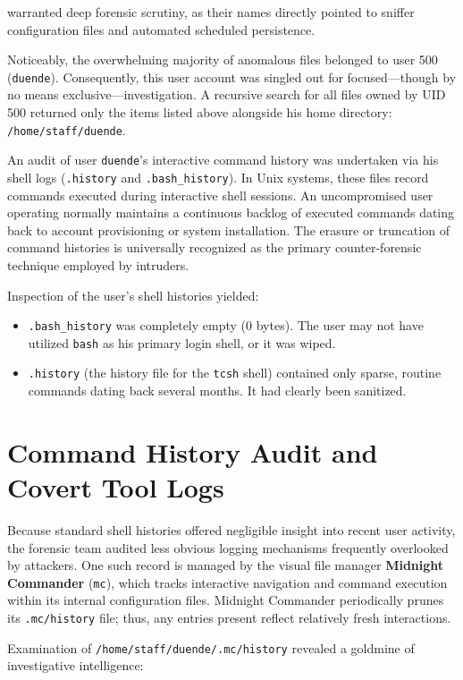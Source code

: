 warranted deep forensic scrutiny, as their names directly pointed to sniffer configuration files and automated scheduled persistence.

Noticeably, the overwhelming majority of anomalous files belonged to user 500 (\texttt{duende}). Consequently, this user account was singled out for focused---though by no means exclusive---investigation. A recursive search for all files owned by UID 500 returned only the items listed above alongside his home directory: \texttt{/home/staff/duende}.

An audit of user \texttt{duende}'s interactive command history was undertaken via his shell logs (\texttt{.history} and \texttt{.bash\_history}). In Unix systems, these files record commands executed during interactive shell sessions. An uncompromised user operating normally maintains a continuous backlog of executed commands dating back to account provisioning or system installation. The erasure or truncation of command histories is universally recognized as the primary counter-forensic technique employed by intruders.

Inspection of the user's shell histories yielded:
\begin{itemize}
    \item \texttt{.bash\_history} was completely empty (0 bytes). The user may not have utilized \texttt{bash} as his primary login shell, or it was wiped.
    \item \texttt{.history} (the history file for the \texttt{tcsh} shell) contained only sparse, routine commands dating back several months. It had clearly been sanitized.
\end{itemize}

\section{Command History Audit and Covert Tool Logs}

Because standard shell histories offered negligible insight into recent user activity, the forensic team audited less obvious logging mechanisms frequently overlooked by attackers. One such record is managed by the visual file manager \textbf{Midnight Commander} (\texttt{mc}), which tracks interactive navigation and command execution within its internal configuration files. Midnight Commander periodically prunes its \texttt{.mc/history} file; thus, any entries present reflect relatively fresh interactions.

Examination of \texttt{/home/staff/duende/.mc/history} revealed a goldmine of investigative intelligence:

